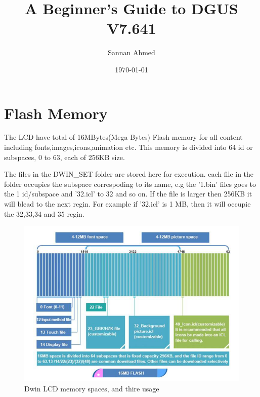 \documentclass[12pt, A4]{article} %
\title{A Beginner's Guide to DGUS V7.641}
\author{Sannan Ahmed}
\date{\today} %
\begin{document}

\begin{titlepage}
\maketitle
\thispagestyle{empty} %
\end{titlepage}


\tableofcontents
\newpage
\section{Flash Memory}
The LCD have total of 16MBytes(Mega Bytes) Flash memory for all content including fonts,images,icons,animation etc. This memory is divided into 64 id or subspaces, 0 to 63, each of 256KB size.

The files in the DWIN\_SET folder are stored here for execution. each file in the folder occupies the subspace correspoding to its name, e.g the '1.bin' files goes to the 1 id/subspace and '32.icl' to 32 and so on. If the file is larger then 256KB it will blead to the next regin. For example if '32.icl' is 1 MB, then it will occupie the 32,33,34 and 35 regin.
\begin{figure}[!htb] %
	\centering
	\includegraphics[width=14cm]{flashMem} 
	\caption{Dwin LCD memory spaces, and thire usage}
\end{figure}
\end{document}
